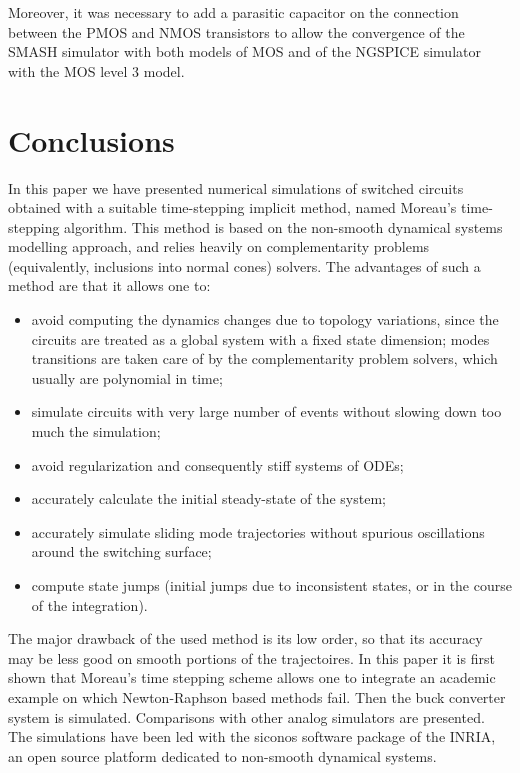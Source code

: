 \documentclass{article}
\begin{document}
Moreover, it was necessary to add a parasitic capacitor on the connection between the PMOS and NMOS
transistors to allow the convergence of the SMASH simulator with both models of MOS
and of the NGSPICE simulator with the MOS level 3 model.


\section{Conclusions}
\label{section5}


In this paper we have presented numerical simulations of switched circuits obtained with a suitable time-stepping implicit method, named Moreau's time-stepping algorithm. This method is based on the non-smooth dynamical systems modelling approach, and relies heavily on complementarity problems (equivalently, inclusions into normal cones) solvers. The advantages of such a method are that it allows one to:

\begin{itemize}

\item avoid computing the dynamics changes due to topology variations, since the circuits are treated as a global system with a fixed state dimension; modes transitions are taken care of by the complementarity problem solvers, which usually are polynomial in time;

\item simulate circuits with very large number of events without slowing down too much the simulation;

\item avoid regularization and consequently stiff systems of ODEs;

\item accurately calculate the initial steady-state of the system;

\item accurately simulate sliding mode trajectories without spurious oscillations around the switching surface;

\item compute state jumps (initial jumps due to inconsistent states, or in the course of the integration). 

\end{itemize}


The major drawback of the used method is its low order, so that its accuracy may be less good on smooth portions of the trajectoires. In this paper it is first shown that Moreau's time stepping scheme allows one to integrate an academic example on which Newton-Raphson based methods fail. Then the buck converter system is simulated. Comparisons with other analog simulators are presented. The simulations have been led with the {\sc siconos} software package of the INRIA, an open source platform dedicated to non-smooth dynamical systems. 




\end{document}
